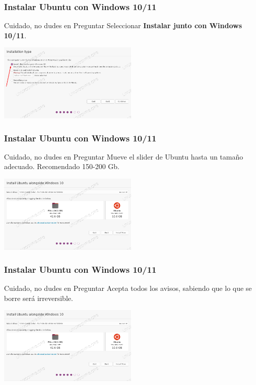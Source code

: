 \documentclass[10pt]{beamer}
\begin{document}
	\begin{frame}
		\frametitle{Instalar Ubuntu con Windows 10/11}
		\begin{alertblock}{Cuidado, no dudes en Preguntar}
			Seleccionar \textbf{Instalar junto con Windows 10/11}.
		\end{alertblock}
		
		\begin{center}
			\includegraphics[width=0.5\textwidth]{windows-10}
		\end{center}
	\end{frame}
	
	\begin{frame}
		\frametitle{Instalar Ubuntu con Windows 10/11}
		\begin{alertblock}{Cuidado, no dudes en Preguntar}
			Mueve el slider de Ubuntu hasta un tamaño adecuado. Recomendado 150-200 Gb.
		\end{alertblock}
		
		\begin{center}
			\includegraphics[width=0.5\textwidth]{windows-10-2}
		\end{center}
	\end{frame}
	
	\begin{frame}
		\frametitle{Instalar Ubuntu con Windows 10/11}
		\begin{alertblock}{Cuidado, no dudes en Preguntar}
			Acepta todos los avisos, sabiendo que lo que se borre será irreversible.
		\end{alertblock}
		
		\begin{center}
			\includegraphics[width=0.5\textwidth]{windows-10-2}
		\end{center}
	\end{frame}
	
\end{document}
